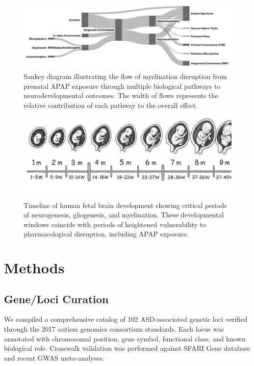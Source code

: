 \documentclass[12pt]{article}
\begin{document}
\begin{figure}[h]
\centering
\includegraphics[width=\textwidth]{../assets/Myelination-Sankey.jpg}
\caption{Sankey diagram illustrating the flow of myelination disruption from prenatal APAP exposure through multiple biological pathways to neurodevelopmental outcomes. The width of flows represents the relative contribution of each pathway to the overall effect.}
\label{fig:sankey}
\end{figure}

\begin{figure}[h]
\centering
\includegraphics[width=\textwidth]{../assets/fetal-development.jpg}
\caption{Timeline of human fetal brain development showing critical periods of neurogenesis, gliogenesis, and myelination. These developmental windows coincide with periods of heightened vulnerability to pharmacological disruption, including APAP exposure.}
\label{fig:fetaldevelopment}
\end{figure}

\section{Methods}

\subsection{Gene/Loci Curation}
We compiled a comprehensive catalog of 102 ASD-associated genetic loci verified through the 2017 autism genomics consortium standards. Each locus was annotated with chromosomal position, gene symbol, functional class, and known biological role. Crosswalk validation was performed against SFARI Gene database and recent GWAS meta-analyses.
\end{document}
